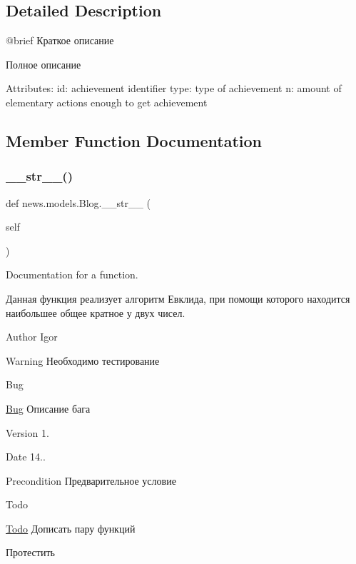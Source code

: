 \subsection{Detailed Description}
\begin{DoxyVerb}    @brief Краткое описание

    Полное описание

    Attributes:
        id: achievement identifier
        type: type of achievement
        n: amount of elementary actions enough to get achievement\end{DoxyVerb}
 

\subsection{Member Function Documentation}
\mbox{\label{classnews_1_1models_1_1_blog_a5cf49bbf405b3dfcbbe79905827ee3e7}} 
\subsubsection{\texorpdfstring{\+\_\+\+\_\+str\+\_\+\+\_\+()}{\_\_str\_\_()}}
{\footnotesize\ttfamily def news.\+models.\+Blog.\+\_\+\+\_\+str\+\_\+\+\_\+ (\begin{DoxyParamCaption}\item[{}]{self }\end{DoxyParamCaption})}



Documentation for a function. 

Данная функция реализует алгоритм Евклида, при помощи которого находится наибольшее общее кратное у двух чисел.

\begin{DoxyAuthor}{Author}
Igor 
\end{DoxyAuthor}
\begin{DoxyWarning}{Warning}
Необходимо тестирование 
\end{DoxyWarning}
\begin{DoxyRefDesc}{Bug}
\item[\mbox{\hyperlink{bug__bug000001}{Bug}}]Описание бага \end{DoxyRefDesc}
\begin{DoxyVersion}{Version}
1. 
\end{DoxyVersion}
\begin{DoxyDate}{Date}
14.. 
\end{DoxyDate}
\begin{DoxyPrecond}{Precondition}
Предварительное условие 
\end{DoxyPrecond}
\begin{DoxyRefDesc}{Todo}
\item[\mbox{\hyperlink{todo__todo000001}{Todo}}]Дописать пару функций 

Протестить\end{DoxyRefDesc}



